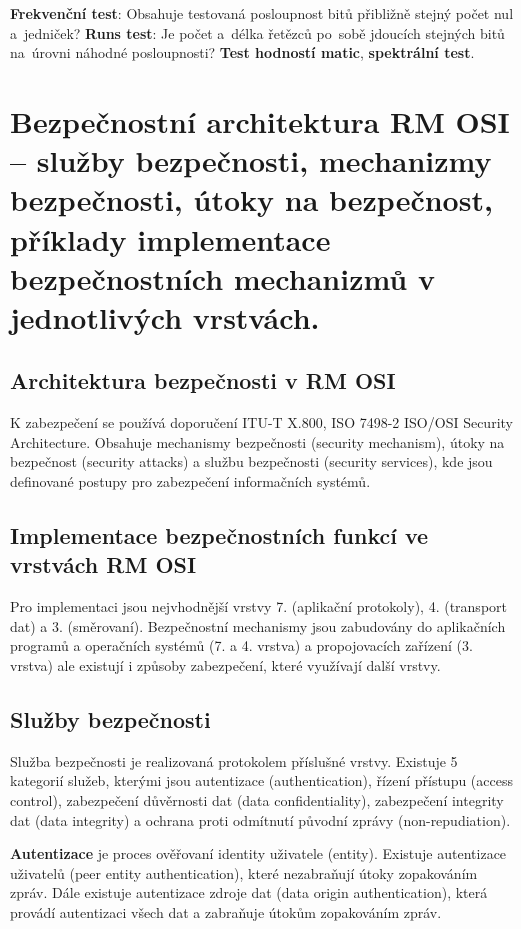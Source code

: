 \textbf{Frekvenční test}: Obsahuje testovaná posloupnost bitů přibližně stejný počet nul a~jedniček? \textbf{Runs test}: Je počet a~délka řetězců po~sobě jdoucích stejných bitů na~úrovni náhodné posloupnosti? \textbf{Test hodností matic}, \textbf{spektrální test}.


\clearpage
\section{Bezpečnostní architektura RM OSI -- služby bezpečnosti, mechanizmy bezpečnosti, útoky na bezpečnost, příklady implementace bezpečnostních mechanizmů v jednotlivých vrstvách.}

\subsection{Architektura bezpečnosti v RM OSI}

K zabezpečení se používá doporučení ITU-T X.800, ISO 7498-2 ISO/OSI Security Architecture. Obsahuje mechanismy bezpečnosti (security mechanism), útoky na bezpečnost (security attacks) a službu bezpečnosti (security services), kde jsou definované postupy pro zabezpečení informačních systémů.

\subsection{Implementace bezpečnostních funkcí ve vrstvách RM OSI}

Pro implementaci jsou nejvhodnější vrstvy 7. (aplikační protokoly), 4. (transport dat) a 3. (směrovaní). Bezpečnostní mechanismy jsou zabudovány do aplikačních programů a operačních systémů (7. a 4. vrstva)  a propojovacích zařízení (3. vrstva) ale existují i způsoby zabezpečení, které využívají další vrstvy.

\subsection{Služby bezpečnosti}

Služba bezpečnosti je realizovaná protokolem příslušné vrstvy. Existuje 5 kategorií služeb, kterými jsou autentizace (authentication), řízení přístupu (access control), zabezpečení důvěrnosti dat (data confidentiality), zabezpečení integrity dat (data integrity) a ochrana proti odmítnutí původní zprávy (non-repudiation).

\textbf{Autentizace} je proces ověřovaní identity uživatele (entity). Existuje autentizace uživatelů (peer entity authentication), které nezabraňují útoky zopakováním zpráv. Dále existuje autentizace zdroje dat (data origin authentication), která provádí autentizaci všech dat a zabraňuje útokům zopakováním zpráv.

